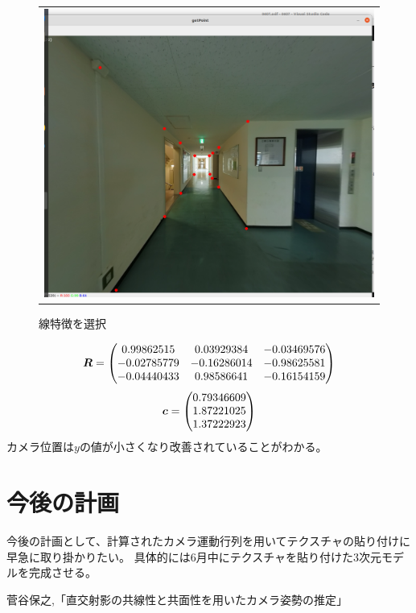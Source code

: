 \documentclass[]{jarticle}          %
\begin{document}
\begin{figure}[!ht]
  \begin{center}
    \begin{tabular}{c}
      \includegraphics[keepaspectratio, scale=0.3]{figures/select_point.png}
    \end{tabular}
  \end{center}
  \caption{線特徴を選択}
  \label{five}
\end{figure}

\begin{equation}
  \mbox{\boldmath $R$} =
  \begin{pmatrix}
    0.99862515 & 0.03929384 & -0.03469576 \\ 
    -0.02785779 & -0.16286014 & -0.98625581 \\
    -0.04440433 & 0.98586641 & -0.16154159 \\
  \end{pmatrix}
\end{equation}
\begin{equation}
  \mbox{\boldmath $c$} =
  \begin{pmatrix}
    0.79346609 \\
    1.87221025 \\
    1.37222923 \\
  \end{pmatrix}
\end{equation}
カメラ位置は$y$の値が小さくなり改善されていることがわかる。
\section{今後の計画}
今後の計画として、計算されたカメラ運動行列を用いてテクスチャの貼り付けに早急に取り掛かりたい。
具体的には6月中にテクスチャを貼り付けた3次元モデルを完成させる。

\begin{thebibliography}{99}
 菅谷保之,「直交射影の共線性と共面性を用いたカメラ姿勢の推定」
\end{thebibliography}
\end{document}
